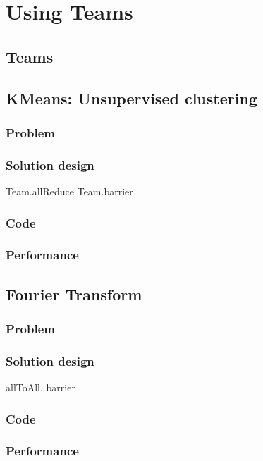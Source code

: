 \chapter{Using Teams}
\section{Teams}
\section{KMeans: Unsupervised clustering}
\subsection{Problem}
\subsection{Solution design} 
    Team.allReduce
    Team.barrier

\subsection{Code} 
\subsection{Performance}

\section{Fourier Transform}
\subsection{Problem}
\subsection{Solution design} 
allToAll, barrier
\subsection{Code} 

\subsection{Performance}

